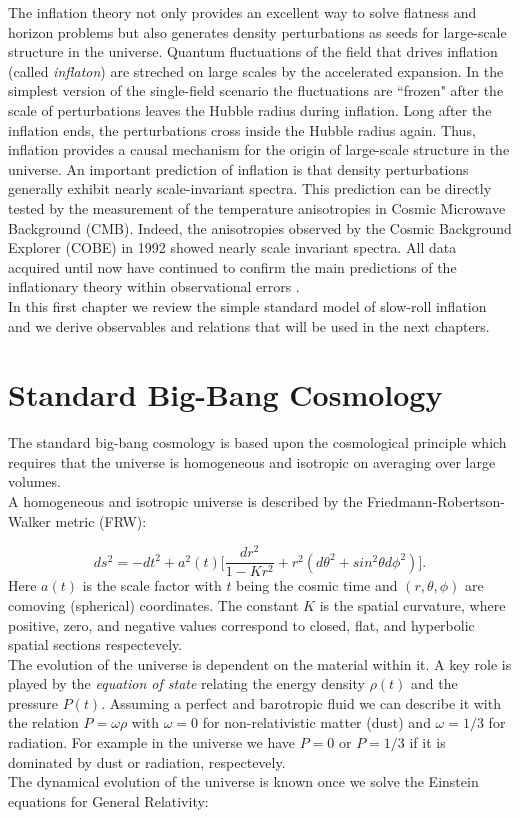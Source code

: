 \documentclass[11pt,a4paper,twoside]{book}
\begin{document}
The inflation theory not only provides an excellent way to solve flatness and horizon problems but also generates density perturbations as seeds for large-scale structure in the universe. Quantum fluctuations of the field that drives inflation (called \textit{inflaton}) are streched on large scales by the accelerated expansion. In the simplest version of the single-field scenario the fluctuations are \textquotedblleft frozen" after the scale of perturbations leaves the Hubble radius during inflation. Long after the inflation ends, the perturbations cross inside the Hubble radius again. Thus, inflation provides a causal mechanism for the origin of large-scale structure in the universe. An important prediction of inflation is that density perturbations generally exhibit nearly scale-invariant spectra. This prediction can be directly tested by the measurement of the temperature anisotropies in Cosmic Microwave Background (CMB). Indeed, the anisotropies observed by the Cosmic Background Explorer (COBE) in 1992 showed nearly scale invariant spectra. All data acquired until now have continued to confirm the main predictions of the inflationary theory within observational errors \cite{InflationDynamicsAndReheating:chap1}.\\
In this first chapter we review the simple standard model of slow-roll inflation and we derive observables and relations that will be used in the next chapters.

\section{Standard Big-Bang Cosmology}

The standard big-bang cosmology is based upon the cosmological principle which requires that the universe is homogeneous and isotropic on averaging over large volumes.\\
A homogeneous and isotropic universe is described by the Friedmann-Robertson-Walker metric (FRW):

\begin{equation}
	\label{metric}	
	ds^{2}   = - dt^{2} + a^{2}(t)\Big[\frac{dr^{2}}{1-Kr^{2}}  +  r^{2}(d\theta^{2} + sin^{2} \theta d\phi^{2})\Big] . 
\end{equation}
Here $a(t)$ is the scale factor with $ t $ being the cosmic time and $(r,\theta,\phi) $ are comoving (spherical) coordinates. The constant $ K $ is the spatial curvature, where positive, zero, and negative values correspond to closed, flat, and hyperbolic spatial sections respectevely. \\
The evolution of the universe is dependent on the material within it. A key role is played by the \textit{equation of state} relating the energy density $ \rho (t) $ and the pressure $ P(t) $. Assuming a perfect and barotropic fluid we can describe it with the relation $ P=\omega\rho $ with $ \omega=0 $ for non-relativistic matter (dust) and $ \omega=1/3 $ for radiation.
For example in the universe we have $ P=0 $ or $ P=1/3 $ if it is dominated by dust or radiation, respectevely. \\
The dynamical evolution of the universe is known once we solve the Einstein equations for General Relativity:
\end{document}
